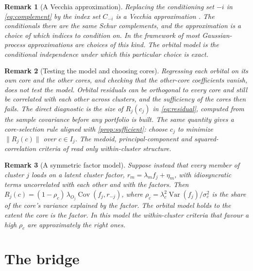 \documentclass[11pt]{article}
\DeclareMathOperator{\Cov}{Cov}
\DeclareMathOperator{\Var}{Var}
\newtheorem{remark}{Remark}
\begin{document}
\begin{remark}[A Vecchia approximation]
Replacing the conditioning set $-i$ in \eqref{eq:complement} by the index
set $C_{-i}$ is a Vecchia approximation \parencite{vecchia1988}. The
conditionals there are the same Schur complements, and the approximation is
a choice of which indices to condition on. In the framework of
\textcite{katzfuss2021} most Gaussian-process approximations are choices of
this kind. The orbital model is the conditional independence under which
this particular choice is exact.
\end{remark}

\begin{remark}[Testing the model and choosing cores]
Regressing each orbital on its own core and the other cores, and checking
that the other-core coefficients vanish, does not test the model. Orbital
residuals can be orthogonal to every core and still be correlated with each
other across clusters, and the sufficiency of the cores then fails. The
direct diagnostic is the size of $R_j(c_j)$ in \eqref{eq:residual},
computed from the sample covariance before any portfolio is built. The same
quantity gives a core-selection rule aligned with
\cref{prop:sufficient}: choose $c_j$ to minimize $\|R_j(c)\|$ over
$c\in I_j$. The medoid, principal-component and squared-correlation
criteria of \textcite{hcoa2026} read only within-cluster structure.
\end{remark}

\begin{remark}[A symmetric factor model]
Suppose instead that every member of cluster $j$ loads on a latent cluster
factor, $r_m=\lambda_m f_j+\eta_m$, with idiosyncratic terms uncorrelated
with each other and with the factors. Then
$R_j(c)=(1-\rho_c)\,\lambda_{O_j}\Cov(f_j,r_{-j})$, where
$\rho_c=\lambda_c^2\Var(f_j)/\sigma_c^2$ is the share of the core's variance
explained by the factor. The orbital model holds to the extent the core is
the factor. In this model the within-cluster criteria that favour a high
$\rho_c$ are approximately the right ones.
\end{remark}

\section{The bridge}
\end{document}
